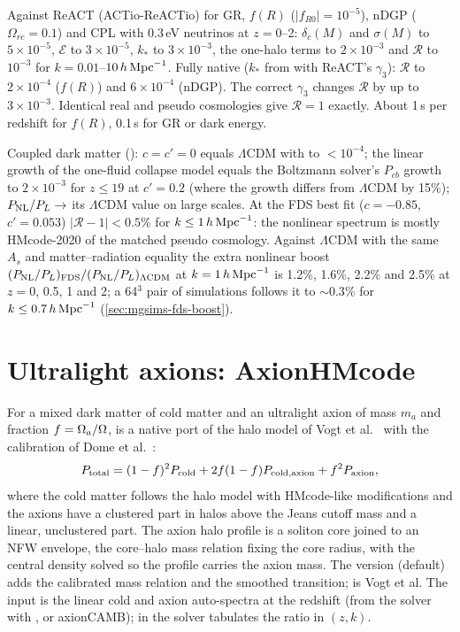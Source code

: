 \begin{validation}
Against ReACT (ACTio-ReACTio) for GR, $f(R)$ ($|f_{R0}|=10^{-5}$), nDGP ($\Omega_{rc}=0.1$) and CPL with 0.3\,eV neutrinos at
$z=0$--2: $\delta_c(M)$ and $\sigma(M)$ to $5\times10^{-5}$, $\mathcal E$ to $3\times10^{-5}$, $k_*$ to $3\times10^{-3}$, the
one-halo terms to $2\times10^{-3}$ and $\mathcal R$ to $10^{-3}$ for $k=0.01$--$10\,h\,\mathrm{Mpc}^{-1}$. Fully native ($k_*$ from
 with ReACT's $\gamma_3$): $\mathcal R$ to $2\times10^{-4}$ ($f(R)$) and $6\times10^{-4}$ (nDGP). The
correct $\gamma_3$ changes $\mathcal R$ by up to $3\times10^{-3}$. Identical real and pseudo cosmologies give $\mathcal R=1$
exactly. About 1\,s per redshift for $f(R)$, 0.1\,s for GR or dark energy.

Coupled dark matter (): $c=c'=0$ equals $\Lambda$CDM with  to
$<10^{-4}$; the linear growth of the one-fluid collapse model equals the Boltzmann solver's $P_{cb}$ growth to $2\times10^{-3}$
for $z\le19$ at $c'=0.2$ (where the growth differs from $\Lambda$CDM by 15\%); $P_{\rm NL}/P_L\to$ its $\Lambda$CDM value on
large scales. At the FDS best fit ($c=-0.85$, $c'=0.053$) $|\mathcal R-1|<0.5\%$ for $k\le1\,h\,\mathrm{Mpc}^{-1}$: the nonlinear spectrum
is mostly HMcode-2020 of the matched pseudo cosmology. Against $\Lambda$CDM with the same $A_s$ and matter--radiation
equality the extra nonlinear boost $(P_{\rm NL}/P_L)_{\rm FDS}/(P_{\rm NL}/P_L)_{\Lambda\rm CDM}$ at $k=1\,h\,\mathrm{Mpc}^{-1}$ is 1.2\%,
1.6\%, 2.2\% and 2.5\% at $z=0$, 0.5, 1 and 2; a 64$^3$ pair of simulations follows it to $\sim0.3\%$ for $k\le0.7\,h\,\mathrm{Mpc}^{-1}$
(\cref{sec:mgsims-fds-boost}).
\end{validation}

\section{Ultralight axions: AxionHMcode}\label{sec:hm-axion}

For a mixed dark matter of cold matter and an ultralight axion of mass $m_a$ and fraction $f=\Omega_a/\Omega$,
 is a native port of the halo model of Vogt et al.\ \cite{Vogt2023} with the calibration of Dome et
al.\ \cite{Dome2024}:
\begin{equation}
P_{\rm total}=(1-f)^2P_{\rm cold}+2f(1-f)P_{\rm cold,axion}+f^2P_{\rm axion},
\end{equation}
where the cold matter follows the halo model with HMcode-like modifications and the axions have a clustered part in halos
above the Jeans cutoff mass and a linear, unclustered part. The axion halo profile is a soliton core joined to an NFW
envelope, the core--halo mass relation fixing the core radius, with the central density solved so the profile carries the
axion mass. The  version (default) adds the calibrated mass relation and the smoothed transition;
 is Vogt et al. The input is the linear cold and axion auto-spectra at the redshift (from the solver with
, or axionCAMB); in the solver  tabulates the ratio in $(z,k)$.

